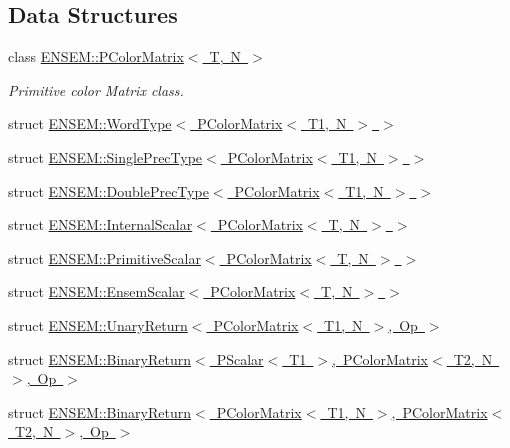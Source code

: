 \subsection*{Data Structures}
\begin{DoxyCompactItemize}
\item 
class \mbox{\hyperlink{classENSEM_1_1PColorMatrix}{E\+N\+S\+E\+M\+::\+P\+Color\+Matrix$<$ T, N $>$}}
\begin{DoxyCompactList}\small\item\em Primitive color Matrix class. \end{DoxyCompactList}\item 
struct \mbox{\hyperlink{structENSEM_1_1WordType_3_01PColorMatrix_3_01T1_00_01N_01_4_01_4}{E\+N\+S\+E\+M\+::\+Word\+Type$<$ P\+Color\+Matrix$<$ T1, N $>$ $>$}}
\item 
struct \mbox{\hyperlink{structENSEM_1_1SinglePrecType_3_01PColorMatrix_3_01T1_00_01N_01_4_01_4}{E\+N\+S\+E\+M\+::\+Single\+Prec\+Type$<$ P\+Color\+Matrix$<$ T1, N $>$ $>$}}
\item 
struct \mbox{\hyperlink{structENSEM_1_1DoublePrecType_3_01PColorMatrix_3_01T1_00_01N_01_4_01_4}{E\+N\+S\+E\+M\+::\+Double\+Prec\+Type$<$ P\+Color\+Matrix$<$ T1, N $>$ $>$}}
\item 
struct \mbox{\hyperlink{structENSEM_1_1InternalScalar_3_01PColorMatrix_3_01T_00_01N_01_4_01_4}{E\+N\+S\+E\+M\+::\+Internal\+Scalar$<$ P\+Color\+Matrix$<$ T, N $>$ $>$}}
\item 
struct \mbox{\hyperlink{structENSEM_1_1PrimitiveScalar_3_01PColorMatrix_3_01T_00_01N_01_4_01_4}{E\+N\+S\+E\+M\+::\+Primitive\+Scalar$<$ P\+Color\+Matrix$<$ T, N $>$ $>$}}
\item 
struct \mbox{\hyperlink{structENSEM_1_1EnsemScalar_3_01PColorMatrix_3_01T_00_01N_01_4_01_4}{E\+N\+S\+E\+M\+::\+Ensem\+Scalar$<$ P\+Color\+Matrix$<$ T, N $>$ $>$}}
\item 
struct \mbox{\hyperlink{structENSEM_1_1UnaryReturn_3_01PColorMatrix_3_01T1_00_01N_01_4_00_01Op_01_4}{E\+N\+S\+E\+M\+::\+Unary\+Return$<$ P\+Color\+Matrix$<$ T1, N $>$, Op $>$}}
\item 
struct \mbox{\hyperlink{structENSEM_1_1BinaryReturn_3_01PScalar_3_01T1_01_4_00_01PColorMatrix_3_01T2_00_01N_01_4_00_01Op_01_4}{E\+N\+S\+E\+M\+::\+Binary\+Return$<$ P\+Scalar$<$ T1 $>$, P\+Color\+Matrix$<$ T2, N $>$, Op $>$}}
\item 
struct \mbox{\hyperlink{structENSEM_1_1BinaryReturn_3_01PColorMatrix_3_01T1_00_01N_01_4_00_01PColorMatrix_3_01T2_00_01N_01_4_00_01Op_01_4}{E\+N\+S\+E\+M\+::\+Binary\+Return$<$ P\+Color\+Matrix$<$ T1, N $>$, P\+Color\+Matrix$<$ T2, N $>$, Op $>$}}

\end{DoxyCompactItemize}
